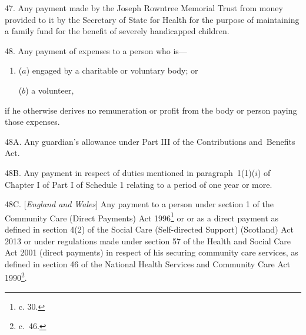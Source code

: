 \documentclass[12pt,a4paper]{article}
\begin{document}
\medskip

47.  Any payment made by the Joseph Rowntree Memorial Trust from money provided to it by the Secretary of State for Health for the purpose of maintaining a family fund for the benefit of severely handicapped children.

\medskip

48.  Any payment of expenses to a person who is—
\begin{enumerate}\item[]
($a$) engaged by a charitable or voluntary body; or

($b$) a volunteer,
\end{enumerate}
if he otherwise derives no remuneration or profit from the body or person paying those expenses.

\medskip


48A.  Any guardian’s allowance under Part III of the Contributions and~Benefits Act. 


\medskip

48B. Any payment in respect of duties mentioned in paragraph~1(1)($i$) of Chapter I of Part I of Schedule 1 relating to a period of one year or more.


\medskip

48C.  [\emph{England and Wales}] Any payment to a person under section 1 of the Community Care (Direct Payments) Act 1996\footnote{ c. 30.} or
or as a direct payment as defined in section 4(2) of the Social Care (Self-directed Support) (Scotland) Act 2013 %
or under regulations made under section 57 of the Health and Social Care Act 2001 (direct payments)  %
in respect of his securing community care services, as defined in section 46 of the National Health Services and Community Care Act 1990\footnote{ c.~46.}.
\end{document}
